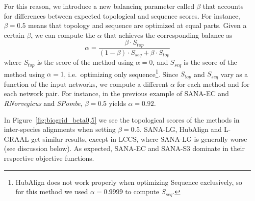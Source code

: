 \documentclass{bioinfo}
\begin{document}
For this reason, we introduce a new balancing parameter called $\beta$ that accounts for differences between expected topological and sequence scores. For instance, $\beta=0.5$ means that topology and sequence are optimized at equal parts. Given a certain $\beta$, we can compute the $\alpha$ that achieves the corresponding balance as
$$\alpha = \frac{\beta\cdot S_{top}}{(1-\beta)\cdot S_{seq}+\beta\cdot S_{top}}$$
where $S_{top}$ is the score of the method using $\alpha=0$, and $S_{seq}$ is the score of the method using $\alpha=1$, i.e.\ optimizing only sequence\footnote{HubAlign does not work properly when optimizing Sequence exclusively, so for this method we used $\alpha=0.9999$ to compute $S_{seq}$.}. Since $S_{top}$ and $S_{seq}$ vary as a function of the input networks, we compute a different $\alpha$ for each method and for each network pair. For instance, in the previous example of SANA-EC and \textit{RNorvegicus} and \textit{SPombe}, $\beta=0.5$ yields $\alpha=0.92$.

In Figure~\ref{fig:biogrid_beta0,5} we see the topological scores of the methods in inter-species alignments when setting $\beta=0.5$. SANA-LG, HubAlign and L-GRAAL get similar results, except in LCCS, where SANA-LG is generally worse (see discussion below). As expected, SANA-EC and SANA-S3 dominate in their respective objective functions.
\end{document}
